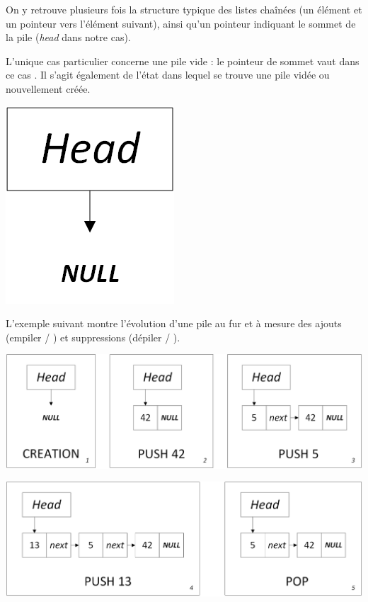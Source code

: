 \documentclass[11pt,a4paper]{article}
\begin{document}
\smallskip

On y retrouve plusieurs fois la structure typique des listes chaînées (un élément et un pointeur vers l'élément suivant), ainsi qu'un pointeur indiquant le sommet de la pile (\textit{head} dans notre cas).

L'unique cas particulier concerne une pile vide : le pointeur de sommet vaut dans ce cas .
Il s'agit également de l'état dans lequel se trouve une pile vidée ou nouvellement créée.\\

\begin{center}
\includegraphics[scale=0.75]{img/piles/Piles_3_Liste_Chainee_Structure_cas_vide.png}
\end{center}

\smallskip

L'exemple suivant montre l'évolution d'une pile au fur et à mesure des ajouts (empiler / ) et suppressions (dépiler / ).\\

\begin{center}
\includegraphics[scale=0.65]{img/piles/Piles_4_Liste_Chainee_Usage_pack_1.png}
\end{center}

\begin{center}
\includegraphics[scale=0.65]{img/piles/Piles_4_Liste_Chainee_Usage_pack_2.png}
\end{center}
\end{document}
